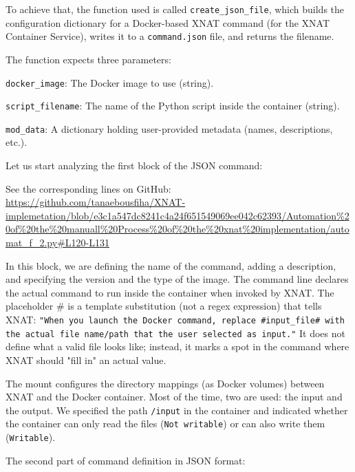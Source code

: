 To achieve that, the function used is called \texttt{create\_json\_file}, which builds the configuration dictionary for a Docker-based XNAT command (for the XNAT Container Service), writes it to a \texttt{command.json} file, and returns the filename.

The function expects three parameters:

\texttt{docker\_image}: The Docker image to use (string).

\texttt{script\_filename}: The name of the Python script inside the container (string).

\texttt{mod\_data}: A dictionary holding user-provided metadata (names, descriptions, etc.).

Let us start analyzing the first block of the JSON command:





\noindent\footnotesize See the corresponding lines on GitHub:\url{ https://github.com/tanaebousfiha/XNAT-implemetation/blob/e3c1a547dc8241c4a24f651549069ee042c62393/Automation%20of%20the%20manuall%20Process%20of%20the%20xnat%20implementation/automat_f_2.py#L120-L131}



In this block, we are defining the name of the command, adding a description, and specifying the version and the type of the image.
The command line declares the actual command to run inside the container when invoked by XNAT. The placeholder \# is a template substitution (not a regex expression) that tells XNAT: \texttt{"When you launch the Docker command, replace \#input\_file\# with the actual file name/path that the user selected as input."} It does not define what a valid file looks like; instead, it marks a spot in the command where XNAT should "fill in" an actual value.


The mount configures the directory mappings (as Docker volumes) between XNAT and the Docker container. Most of the time, two are used: the input and the output.
We specified the path \texttt{/input} in the container and indicated whether the container can only read the files (\texttt{Not writable}) or can also write them (\texttt{Writable}).

The second part of command definition in JSON format:




